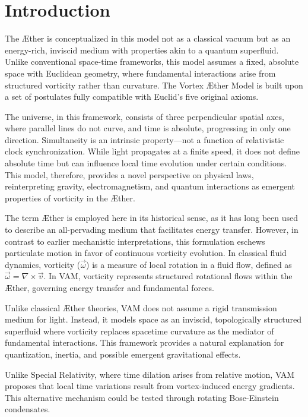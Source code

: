 
\section*{Introduction}
The Æther is conceptualized in this model not as a classical vacuum but as an energy-rich, inviscid medium with properties akin to a quantum superfluid. Unlike conventional space-time frameworks, this model assumes a fixed, absolute space with Euclidean geometry, where fundamental interactions arise from structured vorticity rather than curvature. The Vortex Æther Model is built upon a set of postulates fully compatible with Euclid’s five original axioms.

The universe, in this framework, consists of three perpendicular spatial axes, where parallel lines do not curve, and time is absolute, progressing in only one direction. Simultaneity is an intrinsic property—not a function of relativistic clock synchronization. While light propagates at a finite speed, it does not define absolute time but can influence local time evolution under certain conditions. This model, therefore, provides a novel perspective on physical laws, reinterpreting gravity, electromagnetism, and quantum interactions as emergent properties of vorticity in the Æther.





The term Æther is employed here in its historical sense, as it has long been used to describe an all-pervading medium that facilitates energy transfer.
However, in contrast to earlier mechanistic interpretations, this formulation eschews particulate motion in favor of continuous vorticity evolution. In classical fluid dynamics, vorticity ($\vec{\omega}$) is a measure of local rotation in a fluid flow, defined as $\vec{\omega} = \nabla \times \vec{v}$. In VAM, vorticity represents structured rotational flows within the Æther, governing energy transfer and fundamental forces.

Unlike classical Æther theories, VAM does not assume a rigid transmission medium for light. Instead, it models space as an inviscid, topologically structured superfluid where vorticity replaces spacetime curvature as the mediator of fundamental interactions. This framework provides a natural explanation for quantization, inertia, and possible emergent gravitational effects.

Unlike Special Relativity, where time dilation arises from relative motion, VAM proposes that local time variations result from vortex-induced energy gradients. This alternative mechanism could be tested through rotating Bose-Einstein condensates.



